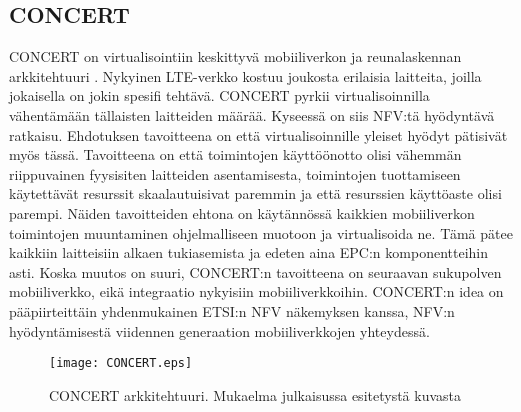 \subsection{CONCERT} \label{concert}




CONCERT on virtualisointiin keskittyvä mobiiliverkon ja reunalaskennan arkkitehtuuri \cite{liu2014concert}.
Nykyinen LTE-verkko kostuu joukosta erilaisia laitteita, joilla jokaisella on jokin spesifi tehtävä.
CONCERT pyrkii virtualisoinnilla vähentämään tällaisten laitteiden määrää.
Kyseessä on siis NFV:tä hyödyntävä ratkaisu.
Ehdotuksen tavoitteena on että virtualisoinnille yleiset hyödyt pätisivät myös tässä.
Tavoitteena on että toimintojen käyttöönotto olisi vähemmän riippuvainen fyysisiten laitteiden asentamisesta, toimintojen tuottamiseen käytettävät resurssit skaalautuisivat paremmin ja että resurssien käyttöaste olisi parempi.
Näiden tavoitteiden ehtona on käytännössä kaikkien mobiiliverkon toimintojen muuntaminen ohjelmalliseen muotoon ja virtualisoida ne.
Tämä pätee kaikkiin laitteisiin alkaen tukiasemista ja edeten aina EPC:n komponentteihin asti.
Koska muutos on suuri, CONCERT:n tavoitteena on seuraavan sukupolven mobiiliverkko, eikä integraatio nykyisiin mobiiliverkkoihin.
CONCERT:n idea on pääpiirteittäin yhdenmukainen ETSI:n NFV näkemyksen \cite{etsinfv5g} kanssa, NFV:n hyödyntämisestä viidennen generaation mobiiliverkkojen yhteydessä.

\begin{figure}[tb]
\texttt{[image: CONCERT.eps]}
\caption{CONCERT arkkitehtuuri. Mukaelma julkaisussa \cite{liu2014concert} esitetystä kuvasta} \label{fig:concert}
\end{figure}

